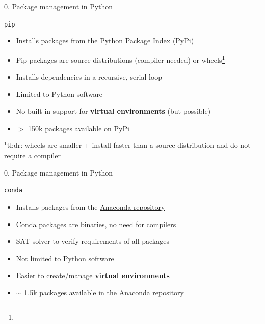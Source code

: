 \documentclass[11pt,compress,t,notes=noshow, xcolor=table]{beamer}
\begin{document}
\begin{vbframe}{0. Package management in Python}
\vfill

\texttt{pip}
			
\begin{itemize}
		\item Installs packages from the \href{https://pypi.org/}{Python Package Index (PyPi)}
		\item Pip packages are source distributions (compiler needed) or wheels\footnote{}
		\item Installs dependencies in a recursive, serial loop
		\item Limited to Python software
		\item No built-in support for \textbf{virtual environments} (but possible)
		\item $>$ 150k packages available on PyPi
\end{itemize}

\vfill

\footnotesize $^1$tl;dr: wheels are smaller + install faster than a source distribution and do not require a compiler

\end{vbframe}


\begin{vbframe}{0. Package management in Python}

\vfill

\texttt{conda}

\begin{itemize}
		\item Installs packages from the \href{https://repo.anaconda.com/}{Anaconda repository}
		\item Conda packages are binaries, no need for compilers
		\item SAT solver to verify requirements of all packages
		\item Not limited to Python software
		\item Easier to create/manage \textbf{virtual environments}
		\item $\sim$ 1.5k packages available in the Anaconda repository
\end{itemize}

\vfill

\end{vbframe}

\end{document}
